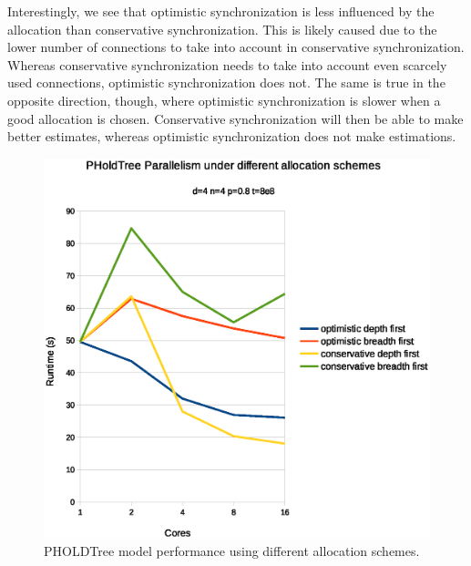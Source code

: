 Interestingly, we see that optimistic synchronization is less influenced by the allocation than conservative synchronization.
This is likely caused due to the lower number of connections to take into account in conservative synchronization.
Whereas conservative synchronization needs to take into account even scarcely used connections, optimistic synchronization does not.
The same is true in the opposite direction, though, where optimistic synchronization is slower when a good allocation is chosen.
Conservative synchronization will then be able to make better estimates, whereas optimistic synchronization does not make estimations. 

\begin{figure}
    \center
    \includegraphics[width=\columnwidth]{fig/pholdtreeallochighp.eps}
    \caption{PHOLDTree model performance using different allocation schemes.}
    \label{fig:PholdTree_plot_alloc_high}
\end{figure}
